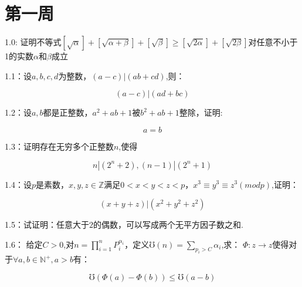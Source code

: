 \documentclass{ctexart}
\title{\LARGE\heiti {华罗庚协会讨论班题目}}
\author{华仔 }
\date{}
\begin{document}
\maketitle

\section{第一周}
1.0: 证明不等式$[\sqrt{\alpha}]+[\sqrt{\alpha+\beta}]+[\sqrt{\beta}]\ge [\sqrt{2 \alpha}]+[\sqrt{2\beta}]$对任意不小于1的实数$\alpha$和$\beta$成立

1.1：设$a,b,c,d$为整数，$(a-c)|(ab+cd)$,则：

	\[
	(a-c)|(ad+bc)
	\]

1.2：设$a,b$都是正整数，$a^2+ab+1$被$b^2+ab+1$整除，证明:

	\[
	a=b
	\]

1.3：证明存在无穷多个正整数$n$,使得
	
		\[
		n|(2^n+2),(n-1)|(2^n+1)
		\]

1.4：设$p$是素数，$x,y,z\in \mathbb{Z}$满足$0<x<y<z<p$，$x^3\equiv y^3\equiv z^3 (mod p)$,证明：
	
		\[
		(x+y+z)|(x^2+y^2+z^2)
		\]

1.5：试证明：任意大于$2$的偶数，可以写成两个无平方因子数之和.


1.6： 给定$C>0$,对$n=\displaystyle\prod_{i=1}^{n} P_{i}^{\alpha_{i}}$，定义$\mho(n)=\displaystyle\sum_{p_i>C} \alpha_{i}$,求：
$\Phi :z \rightarrow z$使得对于$\forall a,b\in \mathbb{N^{+}},a>b$有：

\[\mho (\Phi (a)-\Phi (b))\le \mho (a-b)\]
\end{document}
